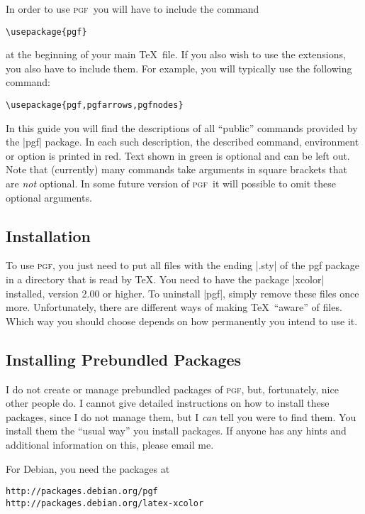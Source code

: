 \documentclass{ltxdoc}
\def\pgf{\textsc{pgf}}
\begin{document}
In order to use \pgf\ you will have to include the command
\begin{verbatim}
\usepackage{pgf}
\end{verbatim}
at the beginning of your main \TeX\ file. If you also wish to use the
extensions, you also have to include them. For example, you will
typically use the following command:
\begin{verbatim}
\usepackage{pgf,pgfarrows,pgfnodes}
\end{verbatim}

In this guide you will find the descriptions of all ``public''
commands provided by the |pgf| package. In each such description, the
described command, environment or option is printed in red. Text shown
in green is optional and can be left out. Note that (currently) many
commands take arguments in square brackets that are \emph{not}
optional. In some future version of \pgf\ it will possible to omit
these optional arguments. 




\subsection{Installation}

To use \pgf, you just need to put all files with the ending
|.sty| of the pgf package in a directory that is read by
\TeX. You need to have the package |xcolor| installed, version 2.00 or
higher. To uninstall |pgf|, simply remove these files once more. 
Unfortunately, there are different ways of making \TeX\ ``aware'' of
files. Which way you should choose depends on how permanently you
intend to use it.


\subsection{Installing Prebundled Packages}

I do not create or manage prebundled packages of \pgf, but,
fortunately, nice other people do. I cannot give detailed instructions
on how to install these packages, since I do not manage them, but I
\emph{can} tell you were to find them. You install them the ``usual
way'' you install packages. If anyone has any hints and additional
information on this, please email me.

For Debian, you need the packages at
\begin{verbatim}
http://packages.debian.org/pgf
http://packages.debian.org/latex-xcolor
\end{verbatim}
\end{document}

